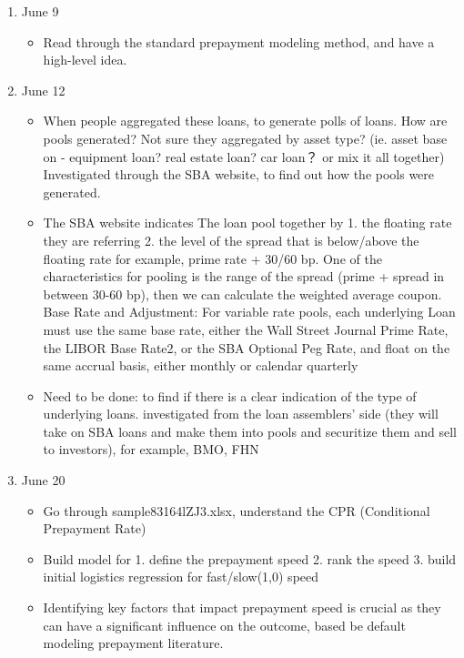 \begin{enumerate}
    \item June 9
    \begin{itemize}
        \item Read through the standard prepayment modeling method, and have a high-level idea.
    \end{itemize}
    \item June 12
    \begin{itemize}
        \item When people aggregated these loans, to generate polls of loans. How are pools generated? Not sure they aggregated by asset type? (ie. asset base on - equipment loan? real estate loan? car loan？ or mix it all together) Investigated through the SBA website, to find out how the pools were generated.
    \end{itemize}
    
    \begin{itemize}
        \item The SBA website indicates The loan pool together by 1. the floating rate they are referring 2. the level of the spread that is below/above the floating rate for example, prime rate + 30/60 bp. One of the characteristics for pooling is the range of the spread (prime + spread in between 30-60 bp), then we can calculate the weighted average coupon. \newline 
        Base Rate and Adjustment: For variable rate pools, each underlying Loan must use the same base rate, either the Wall Street Journal Prime Rate, the LIBOR Base Rate2, or the SBA Optional Peg Rate, and float on the same accrual basis, either monthly or calendar quarterly
    \end{itemize}

    \begin{itemize}

       \item Need to be done: to find if there is a clear indication of the type of underlying loans. investigated from the loan assemblers' side (they will take on SBA loans and make them into pools and securitize them and sell to investors), for example, BMO, FHN 
    \end{itemize}
    
    \item June 20
    \begin{itemize}
        \item Go through sample83164lZJ3.xlsx, understand the CPR (Conditional Prepayment Rate)
        \item Build model for 1. define the prepayment speed 2. rank the speed 3. build initial logistics regression for fast/slow(1,0) speed 
        \item Identifying key factors that impact prepayment speed is crucial as they can have a significant influence on the outcome, based be default modeling prepayment literature.
    \end{itemize}
    

\end{enumerate}
